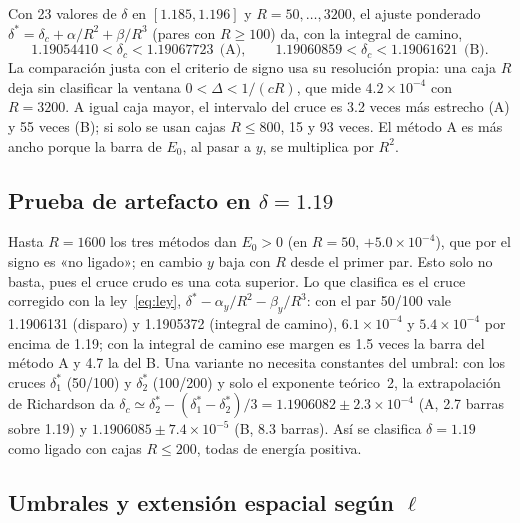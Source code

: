 \documentclass[10pt,letterpaper]{article}
\newcommand{\dc}{\delta_c}
\newcommand{\ee}[2]{#1\times10^{#2}}
\begin{document}
Con 23 valores de $\delta$ en $[1.185,1.196]$ y $R=50,\dots,3200$, el ajuste ponderado $\delta^*=\dc+\alpha/R^2+\beta/R^3$ (pares con $R\ge100$) da, con la integral de camino,
\begin{equation}
1.19054410<\dc<1.19067723\ \ \text{(A)},\qquad 1.19060859<\dc<1.19061621\ \ \text{(B)}.\label{eq:intervalo}
\end{equation}
La comparación justa con el criterio de signo usa su resolución propia: una caja $R$ deja sin clasificar la ventana $0<\Delta<1/(cR)$, que mide $\ee{4.2}{-4}$ con $R=3200$. A igual caja mayor, el intervalo del cruce es 3.2 veces más estrecho (A) y 55 veces (B); si solo se usan cajas $R\le800$, 15 y 93 veces. El método A es más ancho porque la barra de $E_0$, al pasar a $y$, se multiplica por $R^2$.

\subsection{Prueba de artefacto en \texorpdfstring{$\delta=1.19$}{delta = 1.19}}

Hasta $R=1600$ los tres métodos dan $E_0>0$ (en $R=50$, $+\ee{5.0}{-4}$), que por el signo es «no ligado»; en cambio $y$ baja con $R$ desde el primer par. Esto solo no basta, pues el cruce crudo es una cota superior. Lo que clasifica es el cruce corregido con la ley~\eqref{eq:ley}, $\delta^*-\alpha_y/R^2-\beta_y/R^3$: con el par 50/100 vale 1.1906131 (disparo) y 1.1905372 (integral de camino), $\ee{6.1}{-4}$ y $\ee{5.4}{-4}$ por encima de 1.19; con la integral de camino ese margen es 1.5 veces la barra del método A y 4.7 la del B. Una variante no necesita constantes del umbral: con los cruces $\delta^*_1$ (50/100) y $\delta^*_2$ (100/200) y solo el exponente teórico~2, la extrapolación de Richardson da $\dc\simeq\delta^*_2-(\delta^*_1-\delta^*_2)/3=1.1906082\pm\ee{2.3}{-4}$ (A, 2.7 barras sobre 1.19) y $1.1906085\pm\ee{7.4}{-5}$ (B, 8.3 barras). Así se clasifica $\delta=1.19$ como ligado con cajas $R\le200$, todas de energía positiva.

\subsection{Umbrales y extensión espacial según \texorpdfstring{$\ell$}{l}}
\end{document}

